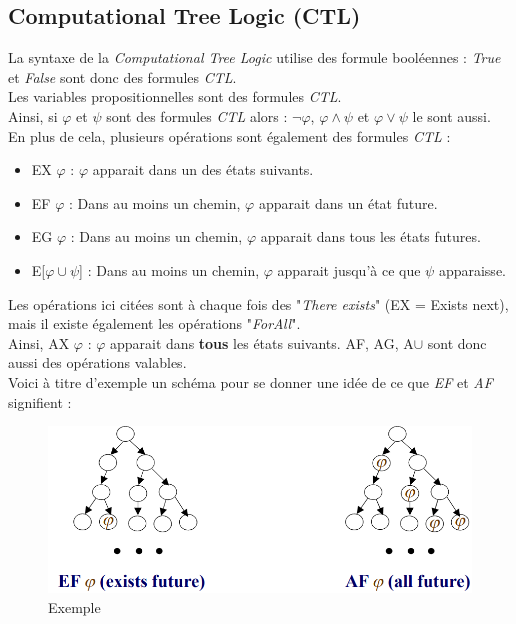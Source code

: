 \documentclass[runningheads,a4paper]{llncs}
\begin{document}
\subsection{Computational Tree Logic (CTL)}

La syntaxe de la \textit{Computational Tree Logic} utilise des formule booléennes : \textit{True} et \textit{False} sont donc des formules \textit{CTL}.\\
Les variables propositionnelles sont des formules \textit{CTL}.\\
Ainsi, si $\varphi$ et $\psi$ sont des formules \textit{CTL} alors : $\lnot \varphi$, $\varphi \land \psi$ et $\varphi \lor \psi$ le sont aussi.\\

\noindent En plus de cela, plusieurs opérations sont également des formules \textit{CTL} : 

\begin{itemize}
\item EX $\varphi$ : $\varphi$ apparait dans un des états suivants.
\item EF $\varphi$ : Dans au moins un chemin, $\varphi$ apparait dans un état future.
\item EG $\varphi$ : Dans au moins un chemin, $\varphi$ apparait dans tous les états futures.
\item E[$\varphi \cup \psi$] : Dans au moins un chemin, $\varphi$ apparait jusqu'à ce que $\psi$ apparaisse. \\
\end{itemize}


\noindent Les opérations ici citées sont à chaque fois des "\textit{There exists}" (EX = Exists next), mais il existe également les opérations "\textit{ForAll}". \\
Ainsi, AX $\varphi$ : $\varphi$ apparait dans \textbf{tous} les états suivants.
AF, AG, A$\cup$ sont donc aussi des opérations valables.\\

\noindent Voici à titre d'exemple un schéma pour se donner une idée de ce que \textit{EF} et \textit{AF} signifient : 

\begin{figure}[!h]
	\includegraphics[scale=0.4]{F.png}
	\centering
	\caption{Exemple}
	\label{label-image5}
\end{figure}
\end{document}
